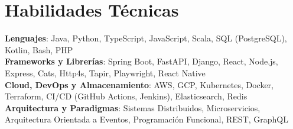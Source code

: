 \documentclass[letterpaper,11pt]{article}
\begin{document}
\section{Habilidades Técnicas}
 \begin{itemize}[leftmargin=0.12in, label={}]
    \small{\item{
     \textbf{Lenguajes}{: Java, Python, TypeScript, JavaScript, Scala, SQL (PostgreSQL), Kotlin, Bash, PHP} \\
     \textbf{Frameworks y Librerías}{: Spring Boot, FastAPI, Django, React, Node.js, Express, Cats, Http4s, Tapir, Playwright, React Native} \\
     \textbf{Cloud, DevOps y Almacenamiento}{: AWS, GCP, Kubernetes, Docker, Terraform, CI/CD (GitHub Actions, Jenkins), Elasticsearch, Redis} \\
     \textbf{Arquitectura y Paradigmas}{: Sistemas Distribuidos, Microservicios, Arquitectura Orientada a Eventos, Programación Funcional, REST, GraphQL}
    }}
 \end{itemize}
\end{document}
